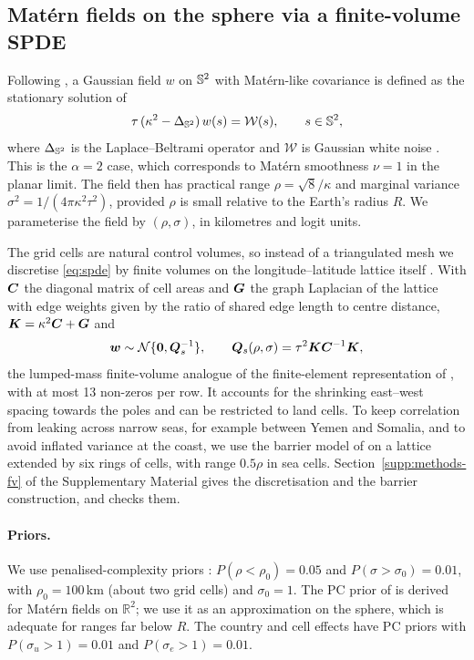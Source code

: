\subsection{Mat\'ern fields on the sphere via a finite-volume SPDE}\label{sec:methods-spde}

Following \citet{lindgren2011spde}, a Gaussian field $w$ on $\mathbb{S}^2$ with
Mat\'ern-like covariance is defined as the stationary solution of
\begin{equation}\label{eq:spde}
\tau\,(\kappa^2 - \Delta_{\mathbb{S}^2})\, w(s) = \mathcal{W}(s), \qquad s \in \mathbb{S}^2,
\end{equation}
where $\Delta_{\mathbb{S}^2}$ is the Laplace--Beltrami operator and $\mathcal{W}$ is
Gaussian white noise \citep[see also][]{lindgren2022spde}. This is the $\alpha = 2$
case, which corresponds to Mat\'ern smoothness $\nu = 1$ in the planar limit. The
field then has practical range $\rho = \sqrt{8}/\kappa$ and marginal variance
$\sigma^2 = 1/(4\pi\kappa^2\tau^2)$, provided $\rho$ is small relative to the
Earth's radius $R$. We parameterise the field by $(\rho, \sigma)$, in kilometres and
logit units.

The grid cells are natural control volumes, so instead of a triangulated mesh we
discretise \eqref{eq:spde} by finite volumes on the longitude--latitude lattice
itself \citep{fuglstad2015exploring}. With $\bm{C}$ the diagonal matrix of cell areas and
$\bm{G}$ the graph Laplacian of the lattice with edge weights given by the ratio of
shared edge length to centre distance, $\bm{K} = \kappa^2 \bm{C} + \bm{G}$ and
\begin{equation}\label{eq:Qs}
\bm{w} \sim \mathcal{N}\{\bm{0}, \bm{Q}_s^{-1}\}, \qquad
\bm{Q}_s(\rho, \sigma) = \tau^2 \bm{K} \bm{C}^{-1} \bm{K},
\end{equation}
the lumped-mass finite-volume analogue of the finite-element representation of
\citet{lindgren2011spde}, with at most 13 non-zeros per row. It accounts for the
shrinking east--west spacing towards the poles and can be restricted to land cells.
To keep correlation from leaking across narrow seas, for example between Yemen and
Somalia, and to avoid inflated variance at the coast, we use the barrier model of
\citet{bakka2019barrier} on a lattice extended by six rings of cells, with range
$0.5\rho$ in sea cells. Section~\ref{supp:methods-fv} of the Supplementary Material
gives the discretisation and the barrier construction, and checks them.

\paragraph{Priors.} We use penalised-complexity priors
\citep{simpson2017pc, fuglstad2019pc}: $P(\rho < \rho_0) = 0.05$ and
$P(\sigma > \sigma_0) = 0.01$, with $\rho_0 = 100$\,km (about two grid cells) and
$\sigma_0 = 1$. The PC prior of \citet{fuglstad2019pc} is derived for Mat\'ern
fields on $\mathbb{R}^2$; we use it as an approximation on the sphere, which is
adequate for ranges far below $R$. The country and cell effects have PC priors with
$P(\sigma_u > 1) = 0.01$ and $P(\sigma_e > 1) = 0.01$.

